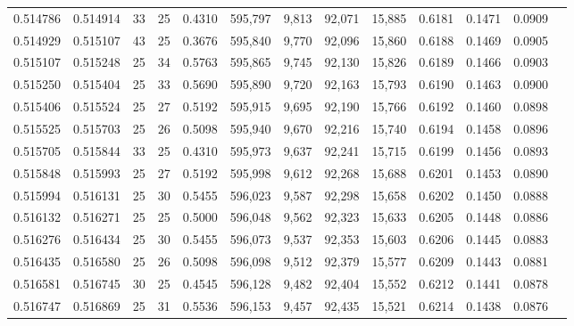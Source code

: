\begin{tabular}{rrrrrrrrrrrrr}
0.514786 & 0.514914 &    33 &  25 &                                     0.4310 & 595,797 &   9,813 &  92,071 &  15,885 & 0.6181 & 0.1471 & 0.0909 \\
0.514929 & 0.515107 &    43 &  25 &                                     0.3676 & 595,840 &   9,770 &  92,096 &  15,860 & 0.6188 & 0.1469 & 0.0905 \\
0.515107 & 0.515248 &    25 &  34 &                                     0.5763 & 595,865 &   9,745 &  92,130 &  15,826 & 0.6189 & 0.1466 & 0.0903 \\
0.515250 & 0.515404 &    25 &  33 &                                     0.5690 & 595,890 &   9,720 &  92,163 &  15,793 & 0.6190 & 0.1463 & 0.0900 \\
0.515406 & 0.515524 &    25 &  27 &                                     0.5192 & 595,915 &   9,695 &  92,190 &  15,766 & 0.6192 & 0.1460 & 0.0898 \\
0.515525 & 0.515703 &    25 &  26 &                                     0.5098 & 595,940 &   9,670 &  92,216 &  15,740 & 0.6194 & 0.1458 & 0.0896 \\
0.515705 & 0.515844 &    33 &  25 &                                     0.4310 & 595,973 &   9,637 &  92,241 &  15,715 & 0.6199 & 0.1456 & 0.0893 \\
0.515848 & 0.515993 &    25 &  27 &                                     0.5192 & 595,998 &   9,612 &  92,268 &  15,688 & 0.6201 & 0.1453 & 0.0890 \\
0.515994 & 0.516131 &    25 &  30 &                                     0.5455 & 596,023 &   9,587 &  92,298 &  15,658 & 0.6202 & 0.1450 & 0.0888 \\
0.516132 & 0.516271 &    25 &  25 &                                     0.5000 & 596,048 &   9,562 &  92,323 &  15,633 & 0.6205 & 0.1448 & 0.0886 \\
0.516276 & 0.516434 &    25 &  30 &                                     0.5455 & 596,073 &   9,537 &  92,353 &  15,603 & 0.6206 & 0.1445 & 0.0883 \\
0.516435 & 0.516580 &    25 &  26 &                                     0.5098 & 596,098 &   9,512 &  92,379 &  15,577 & 0.6209 & 0.1443 & 0.0881 \\
0.516581 & 0.516745 &    30 &  25 &                                     0.4545 & 596,128 &   9,482 &  92,404 &  15,552 & 0.6212 & 0.1441 & 0.0878 \\
0.516747 & 0.516869 &    25 &  31 &                                     0.5536 & 596,153 &   9,457 &  92,435 &  15,521 & 0.6214 & 0.1438 & 0.0876 \\

\end{tabular}

